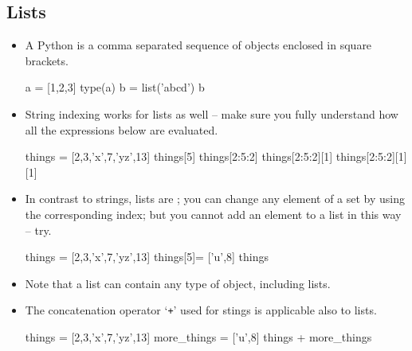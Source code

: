 \documentclass[a4paper]{article}
\begin{document}
\subsection{Lists}

\begin{itemize}
\item A Python  is a comma separated sequence of objects enclosed in
square brackets.


\begin{ucodeframe}
\begin{pyconsole}
a = [1,2,3]
type(a)
b = list('abcd')
b
\end{pyconsole}
\end{ucodeframe}



\item String indexing  works for lists as well -- make sure you fully understand
how all the expressions below are evaluated.


\begin{ucodeframe}
\begin{pyconsole}
things =  [2,3,'x',7,'yz',13]
things[5]
things[2:5:2]
things[2:5:2][1]
things[2:5:2][1][1]
\end{pyconsole}
\end{ucodeframe}

\item In contrast to strings, lists are ; you can change any element of a
set by using the corresponding index; but you cannot add an element to a list in
this way -- try.

\begin{ucodeframe}
\begin{pyconsole}
things =  [2,3,'x',7,'yz',13]
things[5]= ['u',8]
things
\end{pyconsole}
\end{ucodeframe}

\item Note that a list can contain any type of object, including lists.

\item The concatenation operator `\Verb-+-' used for stings is applicable also
to lists.

\begin{ucodeframe}
\begin{pyconsole}
things =  [2,3,'x',7,'yz',13]
more_things = ['u',8]
things + more_things
\end{pyconsole}
\end{ucodeframe}


\end{itemize}
\end{document}
